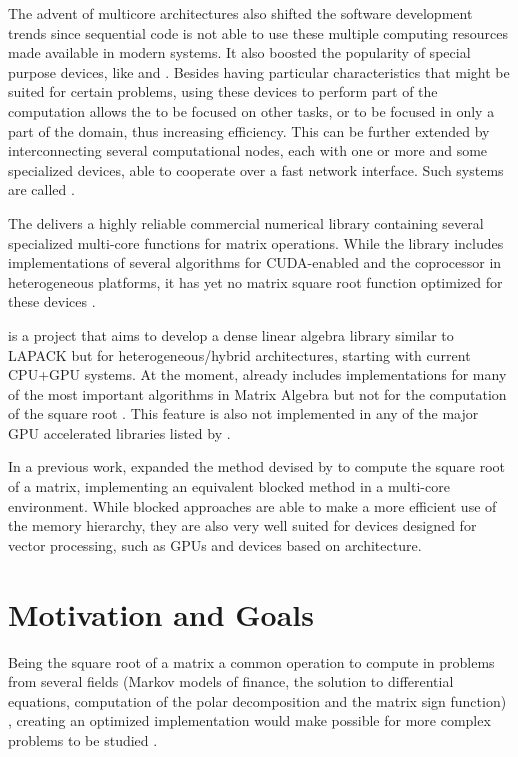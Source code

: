 \documentclass[../thesis]{subfiles}
\begin{document}
	The advent of multicore architectures also shifted the software development trends since sequential code is not able to use these multiple computing resources made available in modern systems. It also boosted the popularity of special purpose devices, like \gpus and \dsps. Besides having particular characteristics that might be suited for certain problems, using these devices to perform part of the computation allows the \cpu to be focused on other tasks, or to be focused in only a part of the domain, thus increasing efficiency. This can be further extended by interconnecting several computational nodes, each with one or more \cpus and some specialized devices, able to cooperate over a fast network interface. Such systems are called \hetplats.

	The \nag\cite{NAG} delivers a highly reliable commercial numerical library containing several specialized multi-core functions for matrix operations. While the \nag library includes implementations of several algorithms for CUDA-enabled \gpus and the \intel\xeonphi coprocessor in heterogeneous platforms, it has yet no matrix square root function optimized for these devices \cite{NAG:GPU:0:6,NAG:MIC}.

	\magma is a project that aims to develop a dense linear algebra library similar to LAPACK but for heterogeneous/hybrid architectures, starting with current CPU+GPU systems. At the moment, \magma already includes implementations for many of the most important algorithms in Matrix Algebra but not for the computation of the square root \cite{PLASMA:MAGMA}. This feature is also not implemented in any of the major GPU accelerated libraries listed by \nvidia \cite{ACCELEREYES:WIKI:SQRTM,CULA:LAPACK,NVIDIA:CUBLAS:5:0,NVIDIA:CUSPARSE:5:0,CUSP:FEATURES}.

	In a previous work,  expanded the method devised by  to compute the square root of a matrix, implementing an equivalent blocked method in a multi-core environment. While blocked approaches are able to make a more efficient use of the memory hierarchy, they are also very well suited for devices designed for vector processing, such as \acfp{GPU} and devices based on \intel\mic architecture.

	\section{Motivation and Goals}
	Being the square root of a matrix a common operation to compute in problems from several fields (Markov models of finance, the solution to differential equations, computation of the polar decomposition and the matrix sign function) \cite{Higham:2008:FM}, creating an optimized implementation would make possible for more complex problems to be studied \cite{Gustafson:1988}.
\end{document}
